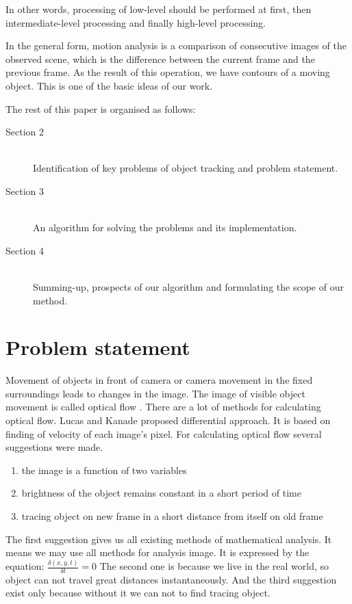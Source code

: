 \documentclass[12pt,a4paper,oneside,titlepage]{article}
\begin{document}
In other words, processing of low-level should be performed at first, then intermediate-level processing and finally high-level processing.

In the general form, motion analysis is a comparison of consecutive images of the observed scene, which is the difference between the current frame and the previous frame.
As the result of this operation, we have contours of a moving object.
This is one of the basic ideas of our work.

The rest of this paper is organised as follows:
\begin{description}
  \item[Section 2] \hfill \\
  Identification of key problems of object tracking and problem statement.
  \item[Section 3] \hfill \\
  An algorithm for solving the problems and its implementation. 
  \item[Section 4] \hfill \\
  Summing-up, prospects of our algorithm and formulating the scope of our method.
\end{description}

\newpage
\section*{Problem statement}
Movement of objects in front of camera or camera movement in the fixed surroundings leads to changes in the image.
The image of visible object movement is called optical flow \cite{opticalflow}.
There are a lot of methods for calculating optical flow.
Lucas and Kanade \cite{lucasKanade} proposed differential approach.
It is based on finding of velocity of each image's pixel.
For calculating optical flow several suggestions were made.

\begin{enumerate}
  \item the image is a function of two variables
  \item brightness of the object remains constant in a short period of time
  \item tracing object on new frame in a short distance from itself on old frame
\end{enumerate}

The first suggestion gives us all existing methods of mathematical analysis. It means we may use all methods for analysis image. 
It is expressed by the equation: {\Large$\frac{\delta (x, y, t)}{\delta t} = 0$}
The second one is because we live in the real world, so object can not travel great distances instantaneously.
And the third suggestion exist only because without it we can not to find tracing object.
\end{document}
